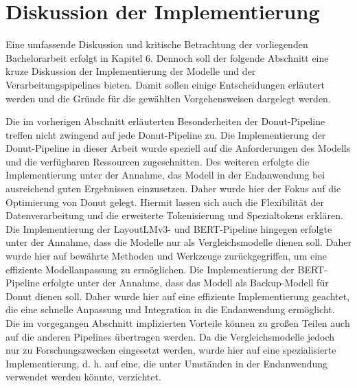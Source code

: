 \section{Diskussion der Implementierung}
Eine umfassende Diskussion und kritische Betrachtung der vorliegenden Bachelorarbeit erfolgt in Kapitel 6. Dennoch soll der folgende Abschnitt eine kruze Diskussion der Implementierung der Modelle und der Verarbeitungspipelines bieten. Damit sollen einige Entscheidungen erläutert werden und die Gründe für die gewählten Vorgehensweisen dargelegt werden.

Die im vorherigen Abschnitt erläuterten Besonderheiten der Donut-Pipeline treffen nicht zwingend auf jede Donut-Pipeline zu. Die Implementierung der Donut-Pipeline in dieser Arbeit wurde speziell auf die Anforderungen des Modells und die verfügbaren Ressourcen zugeschnitten. Des weiteren erfolgte die Implementierung unter der Annahme, das Modell in der Endanwendung bei ausreichend guten Ergebnissen einzusetzen. Daher wurde hier der Fokus auf die Optimierung von Donut gelegt. Hiermit lassen sich auch die Flexibilität der Datenverarbeitung und die erweiterte Tokenisierung und Spezialtokens erklären. Die Implementierung der LayoutLMv3- und BERT-Pipeline hingegen erfolgte unter der Annahme, dass die Modelle nur als Vergleichsmodelle dienen soll. Daher wurde hier auf bewährte Methoden und Werkzeuge zurückgegriffen, um eine effiziente Modellanpassung zu ermöglichen. Die Implementierung der BERT-Pipeline erfolgte unter der Annahme, dass das Modell als Backup-Modell für Donut dienen soll. Daher wurde hier auf eine effiziente Implementierung geachtet, die eine schnelle Anpassung und Integration in die Endanwendung ermöglicht. Die im vorgegangen Abschnitt implizierten Vorteile können zu großen Teilen auch auf die anderen Pipelines übertragen werden. Da die Vergleichsmodelle jedoch nur zu Forschungszwecken eingesetzt werden, wurde hier auf eine spezialisierte Implementierung, d. h. auf eine, die unter Umständen in der Endanwendung verwendet werden könnte, verzichtet.

